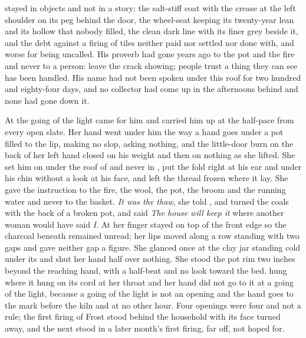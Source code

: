  stayed in objects and not in a story: the salt-stiff coat with the crease at the left shoulder on its peg behind the door, the wheel-seat keeping its twenty-year lean and its hollow that nobody filled, the clean dark line with its finer grey beside it, and the debt against a firing of tiles neither paid nor settled nor done with, and worse for being uncalled. His proverb had gone years ago to the pot and the fire and never to a person: leave the crack showing; people trust a thing they can see has been handled. His name had not been spoken under this roof for two hundred and eighty-four days, and no collector had come up  in the afternoons behind and none had gone down it.

At the going of the light  came for him and carried him up at the half-pace from every open slate. Her hand went under him the way a hand goes under a pot filled to the lip, making no slop, asking nothing, and the little-door burn on the back of her left hand closed on his weight and then on nothing as she lifted. She set him on  under the roof of  and never in , put the fold right at his ear and under his chin without a look at his face, and left the thread frozen where it lay. She gave the instruction to the fire, the wool, the pot, the broom and the running water and never to the basket. \emph{It was the thaw}, she told , and turned the coals with the back of a broken pot, and said \emph{The house will keep it} where another woman would have said \emph{I}. At  her finger stayed on top of the front edge so the charcoal beneath remained unread; her lips moved along a row standing with two gaps and gave neither gap a figure. She glanced once at the clay jar standing cold under its  and shut her hand half over nothing. She stood the pot rim two inches beyond the reaching hand, with a half-beat and no look toward the bed.  hung where it hung on its cord at her throat and her hand did not go to it at a going of the light, because a going of the light is not an opening and the hand goes to the mark before the kiln and at no other hour. Four openings were four and not a rule; the first firing of Frost stood behind the household with its face turned away, and the next stood in a later month's first firing, far off, not hoped for.

